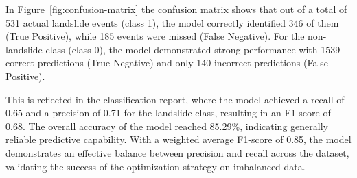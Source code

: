 In Figure~\ref{fig:confusion-matrix} the confusion matrix shows that out of a total of 531 actual landslide events (class 1), the model correctly identified 346 of them (True Positive), while 185 events were missed (False Negative). For the non-landslide class (class 0), the model demonstrated strong performance with 1539 correct predictions (True Negative) and only 140 incorrect predictions (False Positive).

This is reflected in the classification report, where the model achieved a recall of 0.65 and a precision of 0.71 for the landslide class, resulting in an F1-score of 0.68. The overall accuracy of the model reached 85.29\%, indicating generally reliable predictive capability. With a weighted average F1-score of 0.85, the model demonstrates an effective balance between precision and recall across the dataset, validating the success of the optimization strategy on imbalanced data.
